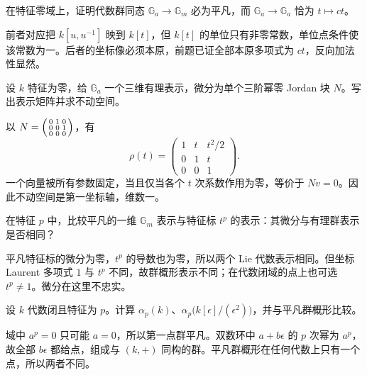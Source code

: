 \begin{optionalexercise}\label{b5:ex:21:11}
	在特征零域上，证明代数群同态 \(\mathbb G_a\to\mathbb G_m\) 必为平凡，而 \(\mathbb G_a\to\mathbb G_a\) 恰为 \(t\mapsto ct\)。
\end{optionalexercise}
\begin{solution}
	前者对应把 \(k[u,u^{-1}]\) 映到 \(k[t]\)，但 \(k[t]\) 的单位只有非零常数，单位点条件使该常数为一。后者的坐标像必须本原，前题已证全部本原多项式为 \(ct\)，反向加法性显然。
\end{solution}

\begin{optionalexercise}\label{b5:ex:21:12}
	设 \(k\) 特征为零，给 \(\mathbb G_a\) 一个三维有理表示，微分为单个三阶幂零 Jordan 块 \(N\)。写出表示矩阵并求不动空间。
\end{optionalexercise}
\begin{solution}
	以 \(N=\begin{psmallmatrix}0&1&0\\0&0&1\\0&0&0\end{psmallmatrix}\)，有
	\[
		\rho(t)=\begin{pmatrix}1&t&t^2/2\\0&1&t\\0&0&1\end{pmatrix}.
	\]
	一个向量被所有参数固定，当且仅当各个 \(t\) 次系数作用为零，等价于 \(Nv=0\)。因此不动空间是第一坐标轴，维数一。
\end{solution}

\begin{optionalexercise}\label{b5:ex:21:13}
	在特征 \(p\) 中，比较平凡的一维 \(\mathbb G_m\) 表示与特征标 \(t^p\) 的表示：其微分与有理群表示是否相同？
\end{optionalexercise}
\begin{solution}
	平凡特征标的微分为零，\(t^p\) 的导数也为零，所以两个 Lie 代数表示相同。但坐标 Laurent 多项式 \(1\) 与 \(t^p\) 不同，故群概形表示不同；在代数闭域的点上也可选 \(t^p\ne1\)。微分在这里不忠实。
\end{solution}

\begin{optionalexercise}\label{b5:ex:21:14}
	设 \(k\) 代数闭且特征为 \(p\)。计算 \(\alpha_p(k)\)、\(\alpha_p\bigl(k[\epsilon]/(\epsilon^2)\bigr)\)，并与平凡群概形比较。
\end{optionalexercise}
\begin{solution}
	域中 \(a^p=0\) 只可能 \(a=0\)，所以第一点群平凡。双数环中 \(a+b\epsilon\) 的 \(p\) 次幂为 \(a^p\)，故全部 \(b\epsilon\) 都给点，组成与 \((k,+)\) 同构的群。平凡群概形在任何代数上只有一个点，所以两者不同。
\end{solution}


